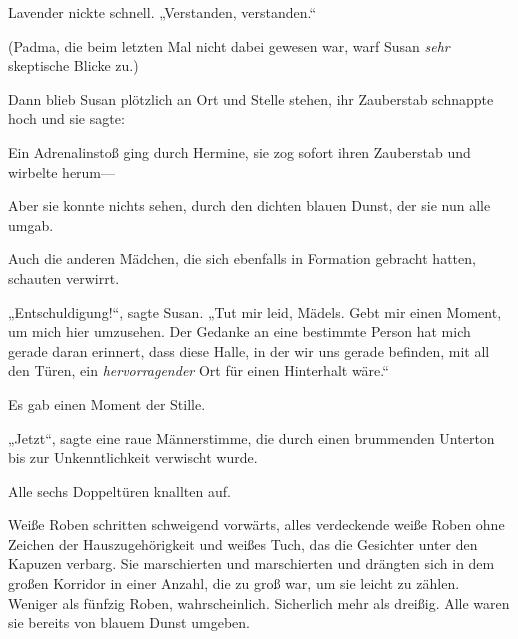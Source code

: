 Lavender nickte schnell. „Verstanden, verstanden.“

(Padma, die beim letzten Mal nicht dabei gewesen war, warf Susan \emph{sehr} skeptische Blicke zu.)

Dann blieb Susan plötzlich an Ort und Stelle stehen, ihr Zauberstab schnappte hoch und sie sagte: 

Ein Adrenalinstoß ging durch Hermine, sie zog sofort ihren Zauberstab und wirbelte herum—

Aber sie konnte nichts sehen, durch den dichten blauen Dunst, der sie nun alle umgab.

Auch die anderen Mädchen, die sich ebenfalls in Formation gebracht hatten, schauten verwirrt.

„Entschuldigung!“, sagte Susan. „Tut mir leid, Mädels. Gebt mir einen Moment, um mich hier umzusehen. Der Gedanke an eine bestimmte Person hat mich gerade daran erinnert, dass diese Halle, in der wir uns gerade befinden, mit all den Türen, ein \emph{hervorragender} Ort für einen Hinterhalt wäre.“

Es gab einen Moment der Stille.

„Jetzt“, sagte eine raue Männerstimme, die durch einen brummenden Unterton bis zur Unkenntlichkeit verwischt wurde.

Alle sechs Doppeltüren knallten auf.

Weiße Roben schritten schweigend vorwärts, alles verdeckende weiße Roben ohne Zeichen der Hauszugehörigkeit und weißes Tuch, das die Gesichter unter den Kapuzen verbarg. Sie marschierten und marschierten und drängten sich in dem großen Korridor in einer Anzahl, die zu groß war, um sie leicht zu zählen. Weniger als fünfzig Roben, wahrscheinlich. Sicherlich mehr als dreißig. Alle waren sie bereits von blauem Dunst umgeben.

